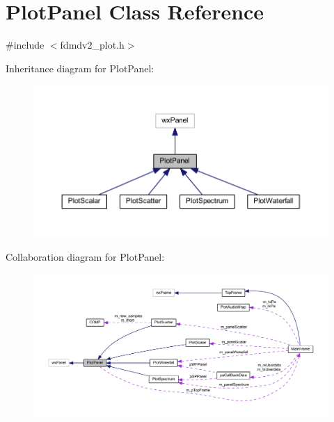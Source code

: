 \hypertarget{class_plot_panel}{\section{Plot\-Panel Class Reference}
\label{class_plot_panel}
}


{\ttfamily \#include $<$fdmdv2\-\_\-plot.\-h$>$}



Inheritance diagram for Plot\-Panel\-:\nopagebreak
\begin{figure}[H]
\begin{center}
\leavevmode
\includegraphics[width=350pt]{class_plot_panel__inherit__graph}
\end{center}
\end{figure}


Collaboration diagram for Plot\-Panel\-:
\nopagebreak
\begin{figure}[H]
\begin{center}
\leavevmode
\includegraphics[width=350pt]{class_plot_panel__coll__graph}
\end{center}
\end{figure}
